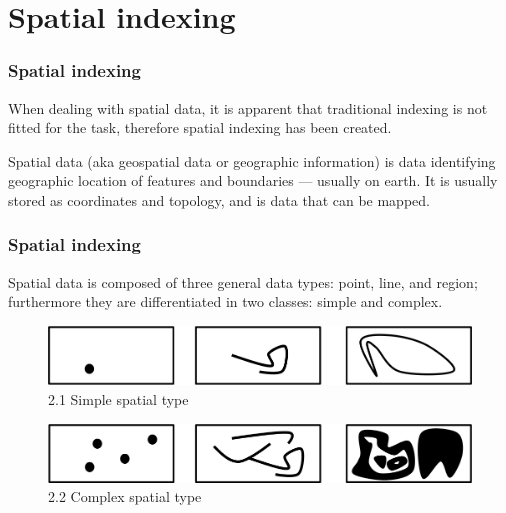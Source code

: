 \documentclass{beamer}
\begin{document}
\section{Spatial indexing}

\begin{frame}
\frametitle{Spatial indexing}
When dealing with spatial data, it is apparent that traditional indexing is not fitted for the task, therefore spatial indexing has been created.

Spatial data (aka geospatial data or geographic information) is data identifying geographic location of features and boundaries --- usually on earth. It is usually stored as coordinates and topology, and is data that can be mapped.
\end{frame}

\begin{frame}
\frametitle{Spatial indexing}
Spatial data is composed of three general data types: point, line, and region; furthermore they are differentiated in two classes: simple and complex.

\begin{figure}[h]
	\includegraphics[scale=.3]{simple_spatial_types.png}
	\caption{2.1 Simple spatial type}
\end{figure}

\begin{figure}[h]
	\includegraphics[scale=.3]{complex_spatial_types.png}
	\caption{2.2 Complex spatial type}
\end{figure}
\end{frame}
\end{document}
